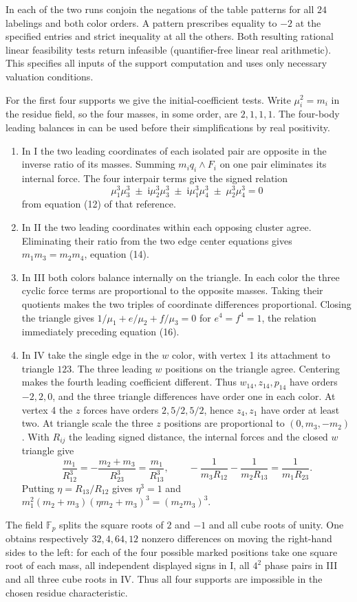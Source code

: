 \documentclass[11pt,letterpaper]{article}
\theoremstyle{definition}
\begin{document}
In each of the two runs conjoin the negations of the table patterns
for all $24$ labelings and both color orders. A pattern prescribes
equality to $-2$ at the specified entries and strict inequality at
all the others. Both resulting rational linear feasibility tests
return infeasible (quantifier-free linear real arithmetic). This
specifies all inputs of the support computation and uses only
necessary valuation conditions.

For the first four supports we give the initial-coefficient tests.
Write $\mu_i^2=m_i$ in the residue field, so the four masses, in
some order, are $2,1,1,1$. The four-body leading balances in
\cite[\S\S 5.1--5.4]{AK} can be used before their simplifications by
real positivity.
\begin{enumerate}
\item In I the two leading coordinates of each isolated pair are
opposite in the inverse ratio of its masses. Summing
$m_i q_i\wedge F_i$ on one pair eliminates its internal force. The
four interpair terms give the signed relation
\[
 \mu_1^3\mu_3^3\;\pm\;\mathrm i\mu_2^3\mu_3^3\;\pm\;
 \mathrm i\mu_1^3\mu_4^3\;\pm\;\mu_2^3\mu_4^3=0
\]
from equation (12) of that reference.
\item In II the two leading coordinates within each opposing cluster
agree. Eliminating their ratio from the two edge center equations
gives $m_1m_3=m_2m_4$, equation (14).
\item In III both colors balance internally on the triangle. In each
color the three cyclic force terms are proportional to the
opposite masses. Taking their quotients makes the two triples of
coordinate differences proportional. Closing the triangle gives
$1/\mu_1+e/\mu_2+f/\mu_3=0$ for $e^4=f^4=1$,
the relation immediately preceding equation (16).
\item In IV take the single edge in the $w$ color, with vertex 1
its attachment to triangle $123$. The three leading $w$ positions on
the triangle agree. Centering makes the fourth leading coefficient
different. Thus $w_{14},z_{14},p_{14}$ have orders $-2,2,0$, and
the three triangle differences have order one in each color. At
vertex 4 the $z$ forces have orders $2,5/2,5/2$, hence $z_4,z_1$
have order at least two. At triangle scale the three $z$ positions
are proportional to $(0,m_3,-m_2)$. With $R_{ij}$ the leading
signed distance, the internal forces and the closed $w$ triangle give
\[
 \frac{m_1}{R_{12}^3}=-\frac{m_2+m_3}{R_{23}^3}
       =\frac{m_1}{R_{13}^3},\qquad
 -\frac1{m_3 R_{12}}-\frac1{m_2 R_{13}}=\frac1{m_1 R_{23}} .
\]
Putting $\eta=R_{13}/R_{12}$ gives $\eta^3=1$ and
$m_1^2(m_2+m_3)(\eta m_2+m_3)^3=(m_2m_3)^3$.
\end{enumerate}
The field $\mathbb F_p$ splits the square roots of $2$ and $-1$
and all cube roots of unity. One obtains respectively $32,4,64,12$
nonzero differences on moving the right-hand sides to the left:
for each of the four possible marked positions take one square root
of each mass, all independent displayed signs in I, all $4^2$ phase
pairs in III and all three cube roots in IV. Thus all four supports
are impossible in the chosen residue characteristic.
\end{document}

